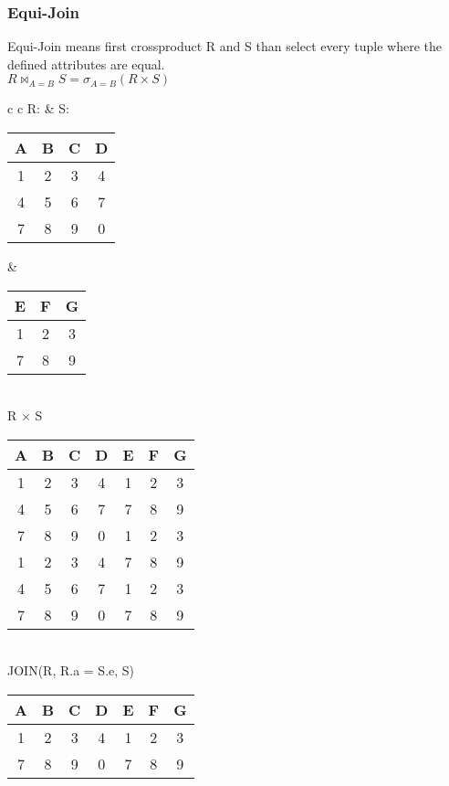 \subsubsection{Equi-Join}
Equi-Join means first crossproduct R and S than select every tuple where the
defined attributes are equal.\\
$R \bowtie_{A = B} S = \sigma_{A = B} (R \times S) $

\begin{tabular}{ c c}
	R: & S: \\
	\begin{tabular}{|c|c|c|c|}
		\hline
		A & B & C & D\\
		\hline
		1 & 2 & 3 & 4\\
		\hline
		4 & 5 & 6 & 7\\
		\hline
		7 & 8 & 9 & 0\\
		\hline
	\end{tabular} &

	\begin{tabular}{|c|c|c|}
		\hline
		E & F & G \\
		\hline
		1 & 2 & 3\\
		\hline
		7 & 8 & 9\\
		\hline
	\end{tabular}
\end{tabular}\\

R $\times$ S \\
\begin{tabular}{|c|c|c|c|c|c|c|}
	\hline
	A & B & C & D & E & F & G\\
	\hline
	1 & 2 & 3 & 4 & 1 & 2 & 3\\
	\hline
	4 & 5 & 6 & 7 & 7 & 8 & 9\\
	\hline
	7 & 8 & 9 & 0 & 1 & 2 & 3\\
	\hline                     
	1 & 2 & 3 & 4 & 7 & 8 & 9\\
	\hline
	4 & 5 & 6 & 7 & 1 & 2 & 3\\
	\hline                     
	7 & 8 & 9 & 0 & 7 & 8 & 9\\
	\hline
\end{tabular}\\

JOIN(R, R.a = S.e, S)\\
\begin{tabular}{|c|c|c|c|c|c|c|}
	\hline
	A & B & C & D & E & F & G\\
	\hline
	1 & 2 & 3 & 4 & 1 & 2 & 3\\
	\hline
	7 & 8 & 9 & 0 & 7 & 8 & 9\\
	\hline
\end{tabular}\\

